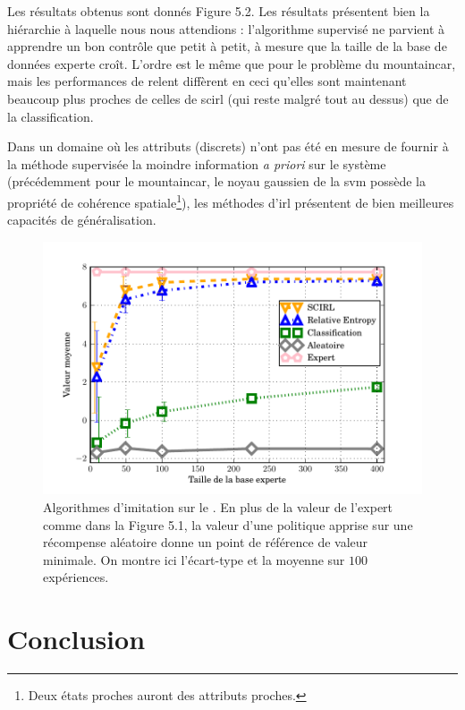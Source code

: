 \documentclass[frenchb,a4paper,justified,notoc]{tufte-book}
\begin{document}
    Les résultats obtenus sont donnés Figure 5.2.
Les résultats présentent bien la hiérarchie à laquelle nous nous attendions : l'algorithme supervisé ne parvient à apprendre un bon contrôle que petit à petit, à mesure que la taille de la base de données experte croît. L'ordre est le même que pour le problème du \gls{mountaincar}, mais les performances de \gls{relent} diffèrent en ceci qu'elles sont maintenant beaucoup plus proches de celles de \gls{scirl} (qui reste malgré tout au dessus) que de la classification.

    Dans un domaine où les attributs (discrets) n'ont pas été en mesure de fournir à la méthode supervisée la moindre information \emph{a priori} sur le système (précédemment pour le \gls{mountaincar}, le noyau gaussien de la \gls{svm} possède la propriété de cohérence spatiale\footnote{Deux états proches auront des attributs proches.
 }), les méthodes d'\gls{irl} présentent de bien meilleures capacités de généralisation.

\begin{figure}
\centering
\includegraphics[width=\textwidth]{Figures/highway_scirl.pdf}
\caption[Algorithmes d'imitation sur le ]{Algorithmes d'imitation sur le . En plus de la valeur de l'expert comme dans la Figure 5.1,
la valeur d'une politique apprise sur une récompense aléatoire donne un point de référence de valeur minimale. On montre ici l'écart-type et la moyenne sur $100$ expériences.}
\label{fig:scirlhighway}
\end{figure}
\section{Conclusion}
\label{sec-5-5}
\end{document}
